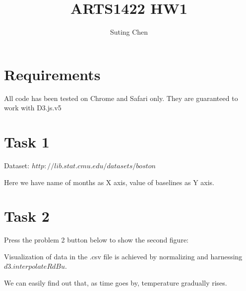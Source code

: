 \documentclass[]{article}
\title{ARTS1422 HW1}
\author{Suting Chen}
\begin{document}
    \maketitle


    \section{Requirements}
    All code has been tested on Chrome and Safari only. They are guaranteed to work with D3.js.v5


    \section{Task 1}
    Dataset: $http://lib.stat.cmu.edu/datasets/boston$
    \begin{center}
    \end{center}
    Here we have name of months as X axis, value of baselines as Y axis.

    \newpage


    \section{Task 2}
    Press the problem 2 button below to show the second figure:
    \begin{center}
    \end{center}
    Visualization of data in the .csv file is achieved by normalizing and harnessing $d3.interpolateRdBu$.

    We can easily find out that, as time goes by, temperature gradually rises.
\end{document}

